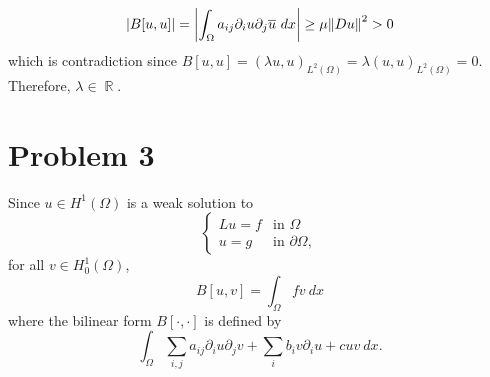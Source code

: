 \documentclass{article}
\DeclareMathOperator{\rr}{\mathbb{R}}
\begin{document}
\begin{enumerate}
\begin{enumerate}
\begin{equation*}
\abs{B[u,u]}=\abs{\int_\Omega a_{ij}\partial_i u\partial_j \overline{u}~dx}\geq \mu \norm{Du}^2>0
\end{equation*}
which is contradiction since $B[u,u]=(\lambda u, u)_{L^2(\Omega)}=\lambda(u,u)_{L^2(\Omega)}=0$. Therefore, $\lambda\in \rr$.
\end{enumerate}
\end{enumerate}





\section*{Problem 3}
Since $u\in H^1(\Omega)$ is a weak solution to
\begin{equation*}
\begin{cases}
Lu=f & \text{in }\Omega \\
u=g & \text{in }\partial \Omega,
\end{cases}
\end{equation*}
for all $v\in H^1_0(\Omega)$,
\begin{equation*}
B[u,v]=\int_\Omega fv~dx
\end{equation*}
where the bilinear form $B[\cdot,\cdot]$ is defined by
\begin{equation*}
\int_\Omega \sum\limits_{i,j}a_{ij}\partial_i u \partial _j v + \sum\limits_{i}b_i v \partial_i u+cuv~dx.
\end{equation*}
\end{document}
